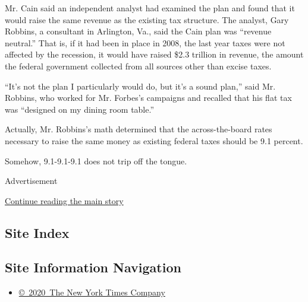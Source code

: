 Mr. Cain said an independent analyst had examined the plan and found
that it would raise the same revenue as the existing tax structure. The
analyst, Gary Robbins, a consultant in Arlington, Va., said the Cain
plan was ``revenue neutral.'' That is, if it had been in place in 2008,
the last year taxes were not affected by the recession, it would have
raised \$2.3 trillion in revenue, the amount the federal government
collected from all sources other than excise taxes.

``It's not the plan I particularly would do, but it's a sound plan,''
said Mr. Robbins, who worked for Mr. Forbes's campaigns and recalled
that his flat tax was ``designed on my dining room table.''

Actually, Mr. Robbins's math determined that the across-the-board rates
necessary to raise the same money as existing federal taxes should be
9.1 percent.

Somehow, 9.1-9.1-9.1 does not trip off the tongue.

Advertisement

\protect\hyperlink{after-bottom}{Continue reading the main story}

\hypertarget{site-index}{%
\subsection{Site Index}\label{site-index}}

\hypertarget{site-information-navigation}{%
\subsection{Site Information
Navigation}\label{site-information-navigation}}

\begin{itemize}
\tightlist
\item
  \href{https://help.nytimes.com/hc/en-us/articles/115014792127-Copyright-notice}{©~2020~The
  New York Times Company}
\end{itemize}

